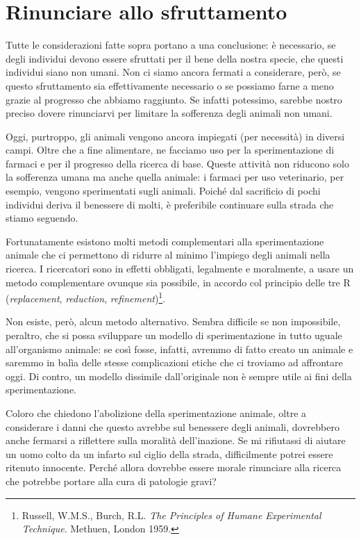 \chapter{Rinunciare allo sfruttamento}
\label{ch:rinunciare-allo-sfruttamento}

Tutte le considerazioni fatte sopra portano a una conclusione: è necessario, se degli individui
devono essere sfruttati per il bene della nostra specie, che questi individui siano non umani. Non
ci siamo ancora fermati a considerare, però, se questo sfruttamento sia effettivamente necessario o
se possiamo farne a meno grazie al progresso che abbiamo raggiunto. Se infatti potessimo, sarebbe
nostro preciso dovere rinunciarvi per limitare la sofferenza degli animali non umani.

Oggi, purtroppo, gli animali vengono ancora impiegati (per necessità) in diversi campi. Oltre che a
fine alimentare, ne facciamo uso per la sperimentazione di farmaci e per il progresso della ricerca
di base. Queste attività non riducono solo la sofferenza umana ma anche quella animale: i farmaci
per uso veterinario, per esempio, vengono sperimentati sugli animali. Poiché dal sacrificio di pochi
individui deriva il benessere di molti, è preferibile continuare sulla strada che stiamo seguendo.

Fortunatamente esistono molti metodi complementari alla sperimentazione animale che ci permettono di
ridurre al minimo l'impiego degli animali nella ricerca. I ricercatori sono in effetti obbligati,
legalmente e moralmente, a usare un metodo complementare ovunque sia possibile, in accordo col
principio delle tre R (\emph{replacement}, \emph{reduction}, \emph{refinement})\footnote{Russell,
W.M.S., Burch, R.L. \emph{The Principles of Humane Experimental Technique}. Methuen, London 1959.}.

Non esiste, però, alcun metodo alternativo. Sembra difficile se non impossibile, peraltro, che si
possa sviluppare un modello di sperimentazione in tutto uguale all'organismo animale: se così fosse,
infatti, avremmo di fatto creato un animale e saremmo in balìa delle stesse complicazioni etiche che
ci troviamo ad affrontare oggi. Di contro, un modello dissimile dall'originale non è sempre utile ai
fini della sperimentazione.

Coloro che chiedono l'abolizione della sperimentazione animale, oltre a considerare i danni che
questo avrebbe sul benessere degli animali, dovrebbero anche fermarsi a riflettere sulla moralità
dell'inazione. Se mi rifiutassi di aiutare un uomo colto da un infarto sul ciglio della strada,
difficilmente potrei essere ritenuto innocente. Perché allora dovrebbe essere morale rinunciare alla
ricerca che potrebbe portare alla cura di patologie gravi?
